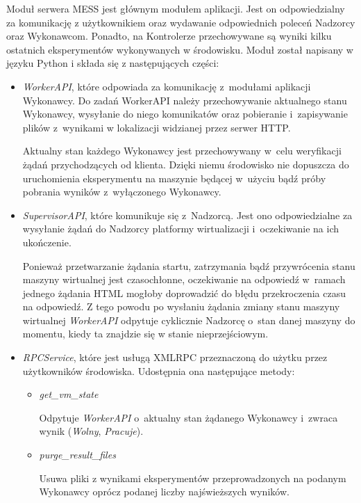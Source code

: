 \documentclass[a4paper,12pt,oneside]{article}
\begin{document}
	Moduł serwera MESS jest głównym modułem aplikacji. Jest on odpowiedzialny za komunikację z użytkownikiem oraz wydawanie odpowiednich poleceń Nadzorcy oraz Wykonawcom. Ponadto, na Kontrolerze przechowywane są wyniki kilku ostatnich eksperymentów wykonywanych w środowisku. Moduł został napisany w języku Python \cite{www-python} i składa się z następujących części:
	\begin{itemize}
		\item \textit{WorkerAPI}, które odpowiada za komunikację z~modułami aplikacji Wykonawcy. Do zadań WorkerAPI należy przechowywanie aktualnego stanu Wykonawcy, wysyłanie do niego komunikatów oraz pobieranie i~zapisywanie plików z~wynikami w lokalizacji widzianej przez serwer HTTP.
		
		Aktualny stan każdego Wykonawcy jest przechowywany w~celu weryfikacji żądań przychodzących od klienta. Dzięki niemu środowisko nie dopuszcza do uruchomienia eksperymentu na maszynie będącej w~użyciu bądź próby pobrania wyników z~wyłączonego Wykonawcy.
		
		\item \textit{SupervisorAPI}, które komunikuje się z~Nadzorcą. Jest ono odpowiedzialne za wysyłanie żądań do Nadzorcy platformy wirtualizacji i~oczekiwanie na ich ukończenie.
		
		Ponieważ przetwarzanie żądania startu, zatrzymania bądź przywrócenia stanu maszyny wirtualnej jest czasochłonne, oczekiwanie na odpowiedź w~ramach jednego żądania HTML mogłoby doprowadzić do błędu przekroczenia czasu na odpowiedź. Z tego powodu po wysłaniu żądania zmiany stanu maszyny wirtualnej \textit{WorkerAPI} odpytuje cyklicznie Nadzorcę o~stan danej maszyny do momentu, kiedy ta znajdzie się w stanie nieprzejściowym.
		
		\item \textit{RPCService}, które jest usługą XMLRPC przeznaczoną do użytku przez użytkowników środowiska. Udostępnia ona następujące metody:
		\begin{itemize}
			\item \textit{get\_vm\_state} 
			
			Odpytuje \textit{WorkerAPI} o~aktualny stan żądanego Wykonawcy i~zwraca wynik (\textit{Wolny}, \textit{Pracuje}).
			
			\item \textit{purge\_result\_files} 			
			
			Usuwa pliki z wynikami eksperymentów przeprowadzonych na podanym Wykonawcy oprócz podanej liczby najświeższych wyników.
			

\end{itemize}
\end{itemize}
\end{document}
